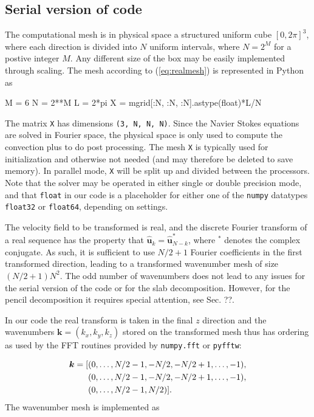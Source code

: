 \documentclass[11pt, oneside]{article}
\newcommand{\inpyth}{\lstinline[style=pythonstyle, basicstyle=\ttfamily]} %[]%
\begin{document}
\subsection{Serial version of code}
The computational mesh is in physical space a structured uniform cube $[0, 2\pi]^3$, where each direction is divided into $N$ uniform intervals, where $N=2^M$ for a postive integer $M$. Any different size of the box may be easily implemented through scaling. The mesh according to (\ref{eq:realmesh}) is represented in Python as

\begin{python}
M = 6
N = 2**M
L = 2*pi
X = mgrid[:N, :N, :N].astype(float)*L/N
\end{python}
The matrix \inpyth{X} has dimensions \inpyth{(3, N, N, N)}. Since the Navier Stokes equations are solved in Fourier space, the physical space is only used to compute the convection plus to do post processing. The mesh \inpyth{X} is typically used for initialization and otherwise not needed (and may therefore be deleted to save memory). In parallel mode, \inpyth{X} will be split up and divided between the processors.  Note that the solver may be operated in either single or double precision mode, and that \inpyth{float} in our code is a placeholder for either one of the \inpyth{numpy} datatypes \inpyth{float32} or \inpyth{float64}, depending on settings.

The velocity field to be transformed is real, and the discrete Fourier transform of a real sequence has the property that $\hat{\bm{u}}_k = \hat{\bm{u}}_{N-k}^*$, where $^*$ denotes the complex conjugate. As such, it is sufficient to use $N/2+1$ Fourier coefficients in the first transformed direction, leading to a transformed wavenumber mesh of size $(N/2+1)N^2$. The odd number of wavenumbers does not lead to any issues for the serial version of the code or for the slab decomposition. However, for the pencil decomposition it requires special attention, see Sec. ??. 

In our code the real transform is taken in the final $z$ direction and the wavenumbers $\bm{k}=(k_x, k_y, k_z)$ stored on the transformed mesh thus has ordering as used by the FFT routines provided by \texttt{numpy.fft} or \texttt{pyfftw}:

\begin{align}
  \bm{k} = [&(0, \ldots, N/2-1, -N/2, -N/2+1, \ldots, -1), \notag \\
   &(0, \ldots, N/2-1, -N/2, -N/2+1, \ldots, -1),  \notag \\
  &(0, \ldots, N/2-1, N/2)].
\end{align}
The wavenumber mesh is implemented as
\end{document}
